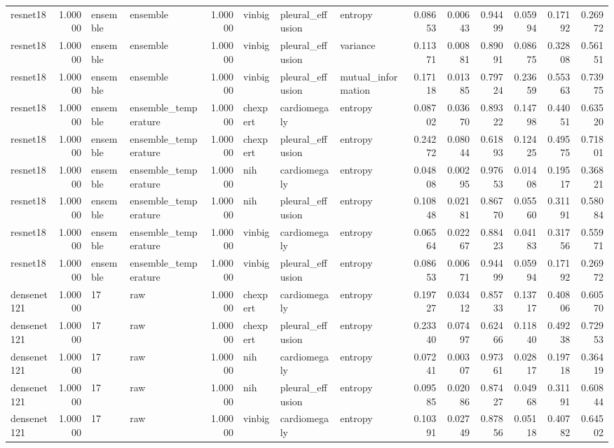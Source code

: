 \begin{tabular}{lrllrlllrrrrrr}
resnet18 & 1.00000 & ensemble & ensemble & 1.00000 & vinbig & pleural\_effusion & entropy & 0.08653 & 0.00643 & 0.94499 & 0.05994 & 0.17192 & 0.26972 \\
resnet18 & 1.00000 & ensemble & ensemble & 1.00000 & vinbig & pleural\_effusion & variance & 0.11371 & 0.00881 & 0.89091 & 0.08675 & 0.32808 & 0.56151 \\
resnet18 & 1.00000 & ensemble & ensemble & 1.00000 & vinbig & pleural\_effusion & mutual\_information & 0.17118 & 0.01385 & 0.79724 & 0.23659 & 0.55363 & 0.73975 \\
resnet18 & 1.00000 & ensemble & ensemble\_temperature & 1.00000 & chexpert & cardiomegaly & entropy & 0.08702 & 0.03670 & 0.89322 & 0.14798 & 0.44051 & 0.63520 \\
resnet18 & 1.00000 & ensemble & ensemble\_temperature & 1.00000 & chexpert & pleural\_effusion & entropy & 0.24272 & 0.08044 & 0.61893 & 0.12425 & 0.49575 & 0.71801 \\
resnet18 & 1.00000 & ensemble & ensemble\_temperature & 1.00000 & nih & cardiomegaly & entropy & 0.04808 & 0.00295 & 0.97653 & 0.01408 & 0.19517 & 0.36821 \\
resnet18 & 1.00000 & ensemble & ensemble\_temperature & 1.00000 & nih & pleural\_effusion & entropy & 0.10848 & 0.02181 & 0.86770 & 0.05560 & 0.31191 & 0.58084 \\
resnet18 & 1.00000 & ensemble & ensemble\_temperature & 1.00000 & vinbig & cardiomegaly & entropy & 0.06564 & 0.02267 & 0.88423 & 0.04183 & 0.31756 & 0.55971 \\
resnet18 & 1.00000 & ensemble & ensemble\_temperature & 1.00000 & vinbig & pleural\_effusion & entropy & 0.08653 & 0.00671 & 0.94499 & 0.05994 & 0.17192 & 0.26972 \\
densenet121 & 1.00000 & 17 & raw & 1.00000 & chexpert & cardiomegaly & entropy & 0.19727 & 0.03412 & 0.85733 & 0.13717 & 0.40806 & 0.60570 \\
densenet121 & 1.00000 & 17 & raw & 1.00000 & chexpert & pleural\_effusion & entropy & 0.23340 & 0.07497 & 0.62466 & 0.11840 & 0.49238 & 0.72953 \\
densenet121 & 1.00000 & 17 & raw & 1.00000 & nih & cardiomegaly & entropy & 0.07241 & 0.00307 & 0.97361 & 0.02817 & 0.19718 & 0.36419 \\
densenet121 & 1.00000 & 17 & raw & 1.00000 & nih & pleural\_effusion & entropy & 0.09585 & 0.02086 & 0.87427 & 0.04968 & 0.31191 & 0.60844 \\
densenet121 & 1.00000 & 17 & raw & 1.00000 & vinbig & cardiomegaly & entropy & 0.10391 & 0.02749 & 0.87856 & 0.05118 & 0.40782 & 0.64502 \\

\end{tabular}
